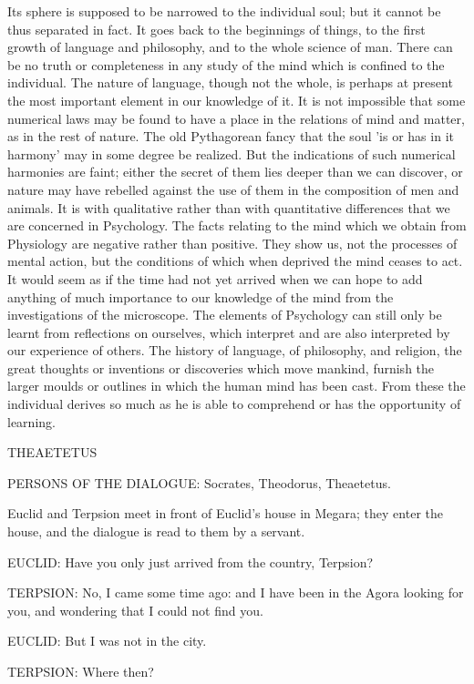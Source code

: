 Its sphere is supposed to be narrowed to the individual soul; but it
cannot be thus separated in fact. It goes back to the beginnings of
things, to the first growth of language and philosophy, and to the whole
science of man. There can be no truth or completeness in any study of
the mind which is confined to the individual. The nature of language,
though not the whole, is perhaps at present the most important element
in our knowledge of it. It is not impossible that some numerical laws
may be found to have a place in the relations of mind and matter, as in
the rest of nature. The old Pythagorean fancy that the soul 'is or has
in it harmony' may in some degree be realized. But the indications
of such numerical harmonies are faint; either the secret of them lies
deeper than we can discover, or nature may have rebelled against the use
of them in the composition of men and animals. It is with qualitative
rather than with quantitative differences that we are concerned
in Psychology. The facts relating to the mind which we obtain from
Physiology are negative rather than positive. They show us, not the
processes of mental action, but the conditions of which when deprived
the mind ceases to act. It would seem as if the time had not yet arrived
when we can hope to add anything of much importance to our knowledge
of the mind from the investigations of the microscope. The elements of
Psychology can still only be learnt from reflections on ourselves, which
interpret and are also interpreted by our experience of others. The
history of language, of philosophy, and religion, the great thoughts or
inventions or discoveries which move mankind, furnish the larger moulds
or outlines in which the human mind has been cast. From these the
individual derives so much as he is able to comprehend or has the
opportunity of learning.




THEAETETUS


PERSONS OF THE DIALOGUE: Socrates, Theodorus, Theaetetus.

Euclid and Terpsion meet in front of Euclid's house in Megara; they
enter the house, and the dialogue is read to them by a servant.


EUCLID: Have you only just arrived from the country, Terpsion?

TERPSION: No, I came some time ago: and I have been in the Agora looking
for you, and wondering that I could not find you.

EUCLID: But I was not in the city.

TERPSION: Where then?


